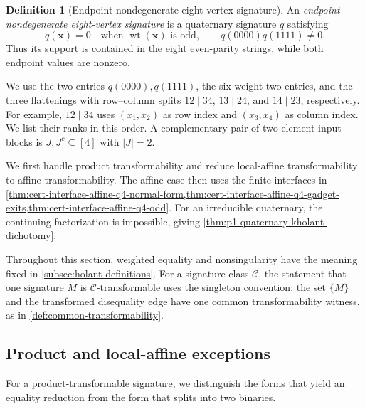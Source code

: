\documentclass[11pt,letterpaper,onecolumn]{article}
\theoremstyle{plain}
\theoremstyle{definition}
\newtheorem{definition}[definition]{Definition}
\theoremstyle{remark}
\newcommand{\cC}{\mathscr C}
\newcommand{\wt}{\operatorname{wt}}
\begin{document}
\begin{definition}[Endpoint-nondegenerate eight-vertex signature]
\label{def:p1-endpoint-eight-vertex}
An \emph{endpoint-nondegenerate eight-vertex signature} is a quaternary
signature \(q\) satisfying
\[
 q({\mathbf{x}})=0\quad\text{when \(\wt({\mathbf{x}})\) is odd},
 \qquad q(0000)q(1111)\ne0.
\]
Thus its support is contained in the eight even-parity strings, while both
endpoint values are nonzero.
\end{definition}
We use the two entries \(q(0000),q(1111)\), the six weight-two entries, and
the three flattenings with row--column splits
\(12\mid34\), \(13\mid24\), and \(14\mid23\), respectively. For example,
\(12\mid34\) uses \((x_1,x_2)\) as row index and \((x_3,x_4)\) as column
index.  We list their ranks in this order.
A complementary pair of two-element input blocks is \(J,J^c\subseteq[4]\) with
\(|J|=2\).

We first handle product transformability and reduce local-affine
transformability to affine transformability. The affine case then uses
the finite interfaces in
\cref{thm:cert-interface-affine-q4-normal-form,thm:cert-interface-affine-q4-gadget-exits,thm:cert-interface-affine-q4-odd}.
For an irreducible quaternary, the continuing factorization is impossible,
giving \cref{thm:p1-quaternary-kholant-dichotomy}.

Throughout this section, weighted equality and nonsingularity have the
meaning fixed in \cref{subsec:holant-definitions}.  For a signature class
\(\cC\), the statement that one signature \(M\) is \(\cC\)-transformable
uses the singleton convention: the set \(\{M\}\) and the transformed disequality edge have one common transformability witness, as in
\cref{def:common-transformability}.

\subsection{Product and local-affine exceptions}

For a product-transformable signature, we distinguish the forms that
yield an equality reduction from the form that splits into two binaries.
\end{document}
